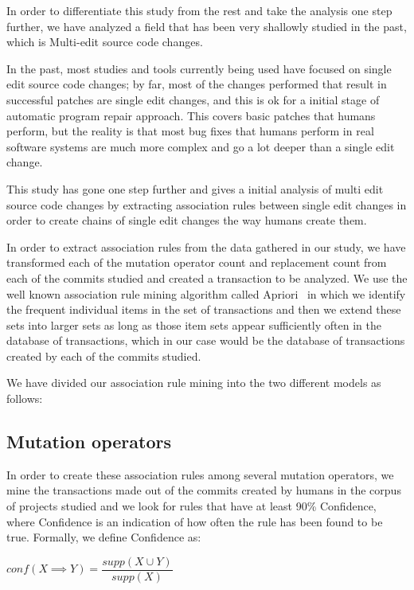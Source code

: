 \documentclass[conference]{IEEEtran}
\begin{document}
In order to differentiate this study from the rest and take the analysis one step further, we have analyzed a field that has been very shallowly studied in the past, which is Multi-edit source code changes.

In the past, most studies and tools currently being used have focused on single edit source code changes; by far, most of the changes performed that result in successful patches are single edit changes, and this is ok for a initial stage of automatic program repair approach. This covers basic patches that humans perform, but the reality is that most bug fixes that humans perform in real software systems are much more complex and go a lot deeper than a single edit change. 

This study has gone one step further and gives a initial analysis of multi edit source code changes by extracting association rules between single edit changes in order to create chains of single edit changes the way humans create them.

In order to extract association rules from the data gathered in our study, we have transformed each of the mutation operator count and replacement count from each of the commits studied and created a transaction to be analyzed. We use the well known association rule mining algorithm called Apriori~\cite{Agrawal94,Liu98,Zaki2000} in which we identify the frequent individual items in the set of transactions and then we extend these sets into larger sets as long as those item sets appear sufficiently often in the database of transactions, which in our case would be the database of transactions created by each of the commits studied.

We have divided our association rule mining into the two different models as follows:

\subsection{Mutation operators}

In order to create these association rules among several mutation operators, we mine the transactions made out of the commits created by humans in the corpus of projects studied and we look for rules that have at least 90\% Confidence, where Confidence is an indication of how often the rule has been found to be true. 
Formally, we define Confidence as:

\begin{center}
$conf(X \implies Y) = \dfrac{supp(X \cup Y)}{supp(X)}$ 
\end{center}
\end{document}
